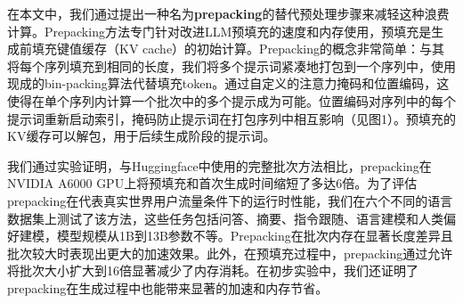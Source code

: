 \documentclass[twocolumn, 10pt]{article} %
\theoremstyle{remark}
\begin{document}
在本文中，我们通过提出一种名为\textbf{prepacking}的替代预处理步骤来减轻这种浪费计算。Prepacking方法专门针对改进LLM预填充的速度和内存使用，预填充是生成前填充键值缓存（KV cache）的初始计算。Prepacking的概念非常简单：与其将每个序列填充到相同的长度，我们将多个提示词紧凑地打包到一个序列中，使用现成的bin-packing算法代替填充token。通过自定义的注意力掩码和位置编码，这使得在单个序列内计算一个批次中的多个提示成为可能。位置编码对序列中的每个提示词重新启动索引，掩码防止提示词在打包序列中相互影响（见图1）。预填充的KV缓存可以解包，用于后续生成阶段的提示词。

我们通过实验证明，与Huggingface中使用的完整批次方法相比，prepacking在NVIDIA A6000 GPU上将预填充和首次生成时间缩短了多达6倍。为了评估prepacking在代表真实世界用户流量条件下的运行时性能，我们在六个不同的语言数据集上测试了该方法，这些任务包括问答、摘要、指令跟随、语言建模和人类偏好建模，模型规模从1B到13B参数不等。Prepacking在批次内存在显著长度差异且批次较大时表现出更大的加速效果。此外，在预填充过程中，prepacking通过允许将批次大小扩大到16倍显著减少了内存消耗。在初步实验中，我们还证明了prepacking在生成过程中也能带来显著的加速和内存节省。
\end{document}
